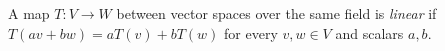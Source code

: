 
A map $T:V\to W$ between vector spaces over the same field is \emph{linear} if $T(av+bw)=aT(v)+bT(w)$ for every $v,w\in V$ and scalars $a,b$.
